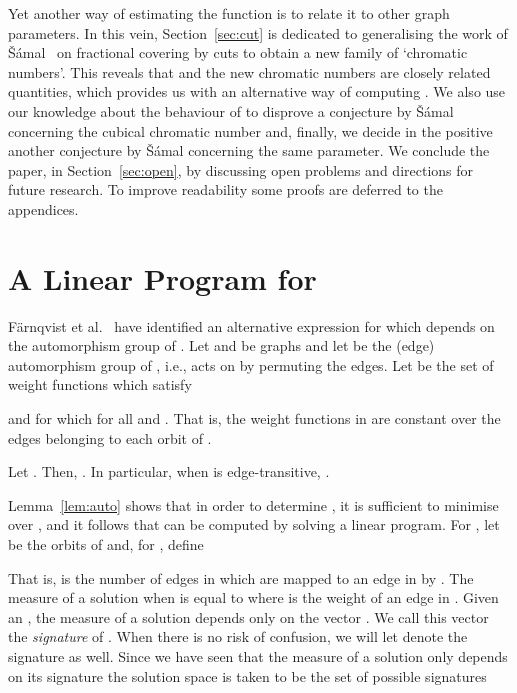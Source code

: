 \documentclass[11pt,a4paper]{article}
\begin{document}
Yet another way of estimating the function  is to relate it
to other graph parameters. In this vein, Section~\ref{sec:cut} is dedicated
to generalising the work of \v{S}\'{a}mal~\cite{samal:05,samal:06}
on fractional covering by cuts to obtain a new family of `chromatic
numbers'. This reveals that  and the new chromatic numbers
 are closely related quantities, which provides us with an
alternative way of computing .
We also use our knowledge about the behaviour of  to
disprove a conjecture by \v{S}\'{a}mal concerning the cubical chromatic
number and, finally, we decide in the positive another conjecture by
\v{S}\'{a}mal concerning the same parameter.
We conclude the paper, in Section~\ref{sec:open}, by discussing
open problems and directions for future research.
To improve readability some proofs are deferred to the appendices.





\section{A Linear Program for }
\label{sec:linprog}

F\"arnqvist et al.~\cite{farnqvist:etal:09} have identified 
an alternative expression for 
which depends on the automorphism group of .
Let  and  be graphs and let  be the
(edge) automorphism group of , i.e.,  acts on 
by permuting the edges.
Let  be the set of
weight functions  which satisfy 

and for which  for all  and
. That is, the weight functions in 
are constant over the edges belonging to each orbit of .
\begin{lemma}
\label{lem:auto}
   Let .
    Then,
    .
    In particular, when  is edge-transitive,
    .
\end{lemma}
Lemma~\ref{lem:auto} shows that in order to determine , it is
sufficient to minimise  over , and it follows
that  can be computed by solving a linear program.
For , let  be the orbits
of  and, for , define

That is,  is the number of edges in  which are mapped to an
edge in  by . The measure of a solution  when  is equal to 
where  is the weight of an edge in . Given an ,
the measure of a solution  depends only on the vector
. We call this vector the {\em
signature} of . When there is no risk of confusion,
we will let  denote the signature as well.
Since we have seen that the measure of a solution only
depends on its signature the solution space is taken to be the set of
possible signatures  
\end{document}
